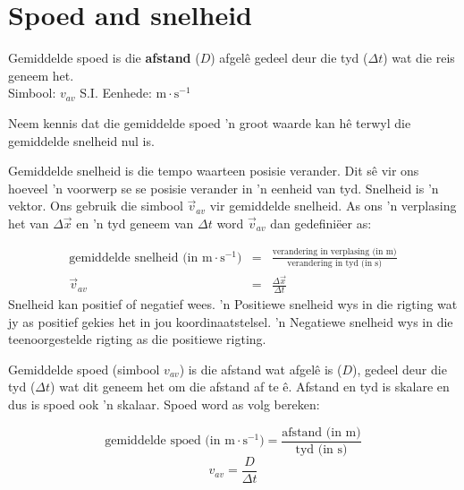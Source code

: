 \section{Spoed and snelheid} 
    \nopagebreak

{Gemiddelde spoed is die \textbf{afstand} ($D$) afgel\^e gedeel deur die tyd ($\Delta t$) wat die reis geneem het.\\
Simbool: $v_{av}$\hspace{2cm} S.I. Eenhede: $\text{m}\cdot \text{s}^{-1}$} 



Neem kennis dat die gemiddelde spoed  'n groot waarde kan h\^e terwyl die gemiddelde snelheid nul is. 


Gemiddelde snelheid is die tempo waarteen posisie verander. Dit s\^e vir ons hoeveel  'n voorwerp se se posisie verander in  'n eenheid van tyd. Snelheid is  'n vektor. Ons gebruik die simbool $\vec{v}_{av}$ vir gemiddelde snelheid. As ons  'n verplasing het van $\Delta \vec{x}$ en  'n tyd geneem van $\Delta t$ word $\vec{v}_{av}$ dan gedefini\"eer as:\par 
\begin{eqnarray*}
\text{gemiddelde snelheid (in m} \cdot \text{s}^{-1}) &=& \frac{\text{verandering in verplasing (in m)}}{\text{verandering in tyd (in s)}}\\
\vec{v}_{av} &=& \frac{\Delta \vec{x}}{\Delta t}
\end{eqnarray*}\label{eq:pr:velocity}
Snelheid kan positief of negatief wees.  'n Positiewe snelheid wys in die rigting wat jy as positief gekies het in jou koordinaatstelsel.  'n Negatiewe snelheid wys in die teenoorgestelde rigting as die positiewe rigting.

Gemiddelde spoed (simbool $v_{av}$) is die afstand wat afgel\^e is ($D$), gedeel deur die tyd ($\Delta t$) wat dit geneem het om die afstand af te \^e. Afstand en tyd is skalare en dus is spoed ook  'n skalaar. Spoed word as volg bereken:\par 
        
\begin{equation*}
\text{gemiddelde spoed (in m} \cdot {\text{s}}^{-1}\text{)}  =  \frac{\text{afstand (in m)}}{\text{tyd (in s)}} 
\end{equation*}
\label{m38791*id64639}\nopagebreak\noindent{}
\begin{equation*}
v_{av}=\frac{D}{\Delta t}
\end{equation*}
     

